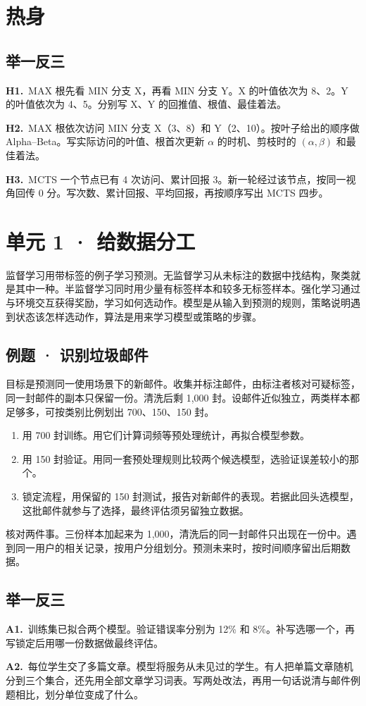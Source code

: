 \documentclass[UTF8,a4paper,11pt]{ctexart}
\newcommand{\CompactQuestion}[2]{\par\noindent\textbf{#1.}\ #2\par\vspace{.8em}}
\begin{document}
\section{热身}
\subsection{举一反三}
\CompactQuestion{H1}{MAX 根先看 MIN 分支 X，再看 MIN 分支 Y。X 的叶值依次为 8、2。Y 的叶值依次为 4、5。分别写 X、Y 的回推值、根值、最佳着法。}
\CompactQuestion{H2}{MAX 根依次访问 MIN 分支 X（3、8）和 Y（2、10）。按叶子给出的顺序做 Alpha–Beta。写实际访问的叶值、根首次更新 $\alpha$ 的时机、剪枝时的 $(\alpha,\beta)$ 和最佳着法。}
\CompactQuestion{H3}{MCTS 一个节点已有 4 次访问、累计回报 3。新一轮经过该节点，按同一视角回传 0 分。写次数、累计回报、平均回报，再按顺序写出 MCTS 四步。}
\clearpage
\section{单元 1 · 给数据分工}
监督学习用带标签的例子学习预测。无监督学习从未标注的数据中找结构，聚类就是其中一种。半监督学习同时用少量有标签样本和较多无标签样本。强化学习通过与环境交互获得奖励，学习如何选动作。模型是从输入到预测的规则，策略说明遇到状态该怎样选动作，算法是用来学习模型或策略的步骤。

\subsection{例题 · 识别垃圾邮件}
目标是预测同一使用场景下的新邮件。收集并标注邮件，由标注者核对可疑标签，同一封邮件的副本只保留一份。清洗后剩 1,000 封。设邮件近似独立，两类样本都足够多，可按类别比例划出 700、150、150 封。

\begin{enumerate}
\item 用 700 封训练。用它们计算词频等预处理统计，再拟合模型参数。
\item 用 150 封验证。用同一套预处理规则比较两个候选模型，选验证误差较小的那个。
\item 锁定流程，用保留的 150 封测试，报告对新邮件的表现。若据此回头选模型，这批邮件就参与了选择，最终评估须另留独立数据。
\end{enumerate}
核对两件事。三份样本加起来为 1,000，清洗后的同一封邮件只出现在一份中。遇到同一用户的相关记录，按用户分组划分。预测未来时，按时间顺序留出后期数据。

\subsection{举一反三}
\CompactQuestion{A1}{训练集已拟合两个模型。验证错误率分别为 12\% 和 8\%。补写选哪一个，再写锁定后用哪一份数据做最终评估。}
\CompactQuestion{A2}{每位学生交了多篇文章。模型将服务从未见过的学生。有人把单篇文章随机分到三个集合，还先用全部文章学习词表。写两处改法，再用一句话说清与邮件例题相比，划分单位变成了什么。}
\clearpage
\end{document}
